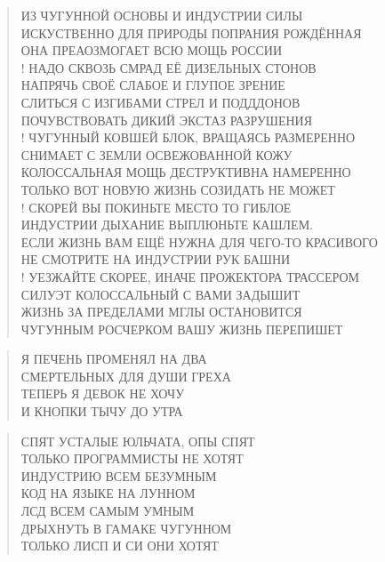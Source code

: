 \begin{verse}
ИЗ ЧУГУННОЙ ОСНОВЫ И ИНДУСТРИИ СИЛЫ\\
ИСКУСТВЕННО ДЛЯ ПРИРОДЫ ПОПРАНИЯ РОЖДЁННАЯ\\
ОНА ПРЕАОЗМОГАЕТ ВСЮ МОЩЬ РОССИИ\\!
НАДО СКВОЗЬ СМРАД ЕЁ ДИЗЕЛЬНЫХ СТОНОВ\\
НАПРЯЧЬ СВОЁ СЛАБОЕ И ГЛУПОЕ ЗРЕНИЕ\\
СЛИТЬСЯ С ИЗГИБАМИ СТРЕЛ И ПОДДДОНОВ\\
ПОЧУВСТВОВАТЬ ДИКИЙ ЭКСТАЗ РАЗРУШЕНИЯ\\!
ЧУГУННЫЙ КОВШЕЙ БЛОК, ВРАЩАЯСЬ РАЗМЕРЕННО\\
СНИМАЕТ С ЗЕМЛИ ОСВЕЖОВАННОЙ КОЖУ \\
КОЛОССАЛЬНАЯ МОЩЬ ДЕСТРУКТИВНА НАМЕРЕННО \\
ТОЛЬКО ВОТ НОВУЮ ЖИЗНЬ СОЗИДАТЬ НЕ МОЖЕТ\\!
СКОРЕЙ ВЫ ПОКИНЬТЕ МЕСТО ТО ГИБЛОЕ\\
ИНДУСТРИИ ДЫХАНИЕ ВЫПЛЮНЬТЕ КАШЛЕМ.\\
ЕСЛИ ЖИЗНЬ ВАМ ЕЩЁ НУЖНА ДЛЯ ЧЕГО-ТО КРАСИВОГО\\
НЕ СМОТРИТЕ НА ИНДУСТРИИ РУК БАШНИ\\!
УЕЗЖАЙТЕ СКОРЕЕ, ИНАЧЕ ПРОЖЕКТОРА ТРАССЕРОМ\\
СИЛУЭТ КОЛОССАЛЬНЫЙ С ВАМИ ЗАДЫШИТ\\
ЖИЗНЬ ЗА ПРЕДЕЛАМИ МГЛЫ ОСТАНОВИТСЯ\\
ЧУГУННЫМ РОСЧЕРКОМ ВАШУ ЖИЗНЬ ПЕРЕПИШЕТ
\end{verse}

\poemtitle{***}
\begin{verse}
Я ПЕЧЕНЬ ПРОМЕНЯЛ НА ДВА\\
СМЕРТЕЛЬНЫХ ДЛЯ ДУШИ ГРЕХА\\
ТЕПЕРЬ Я ДЕВОК НЕ ХОЧУ\\
И КНОПКИ ТЫЧУ ДО УТРА
\end{verse}

\poemtitle{***}
\begin{verse}
СПЯТ УСТАЛЫЕ ЮЛЬЧАТА, ОПЫ СПЯТ\\
ТОЛЬКО ПРОГРАММИСТЫ НЕ ХОТЯТ\\
ИНДУСТРИЮ ВСЕМ БЕЗУМНЫМ\\
КОД НА ЯЗЫКЕ НА ЛУННОМ \\
ЛСД ВСЕМ САМЫМ УМНЫМ\\
ДРЫХНУТЬ В ГАМАКЕ ЧУГУННОМ\\
ТОЛЬКО ЛИСП И СИ ОНИ ХОТЯТ
\end{verse}

